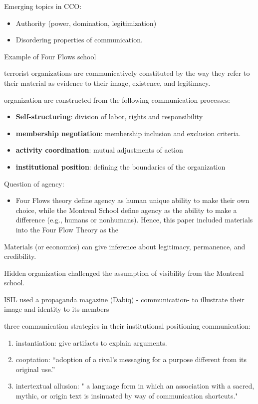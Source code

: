 \documentclass[
]{book}
\providecommand{\tightlist}{%
  \setlength{\itemsep}{0pt}\setlength{\parskip}{0pt}}
\begin{document}
Emerging topics in CCO:

\begin{itemize}
\tightlist
\item
  Authority (power, domination, legitimization)
\item
  Disordering properties of communication.
\end{itemize}

\citep{Bruscella_2018}

Example of Four Flows school

terrorist organizations are communicatively constituted by the way they refer to their material as evidence to their image, existence, and legitimacy.

organization are constructed from the following communication processes:

\begin{itemize}
\tightlist
\item
  \textbf{Self-structuring}: division of labor, rights and responsibility
\item
  \textbf{membership negotiation}: membership inclusion and exclusion criteria.
\item
  \textbf{activity coordination}: mutual adjustments of action
\item
  \textbf{institutional position}: defining the boundaries of the organization
\end{itemize}

Question of agency:

\begin{itemize}
\tightlist
\item
  Four Flows theory define agency as human unique ability to make their own choice, while the Montreal School define agency as the ability to make a difference (e.g., humans or nonhumans). Hence, this paper included materials into the Four Flow Theory as the
\end{itemize}

Materials (or economics) can give inference about legitimacy, permanence, and credibility.

Hidden organization challenged the assumption of visibility from the Montreal school.

ISIL used a propaganda magazine (Dabiq) - communication- to illustrate their image and identity to its members

three communication strategies in their institutional positioning communication:

\begin{enumerate}
\def\labelenumi{(\arabic{enumi})}
\tightlist
\item
  instantiation: give artifacts to explain arguments.
\item
  cooptation: ``adoption of a rival's messaging for a purpose different from its original use.''
\item
  intertextual allusion: " a language form in which an association with a sacred, mythic, or origin text is insinuated by way of communication shortcuts."
\end{enumerate}
\end{document}

